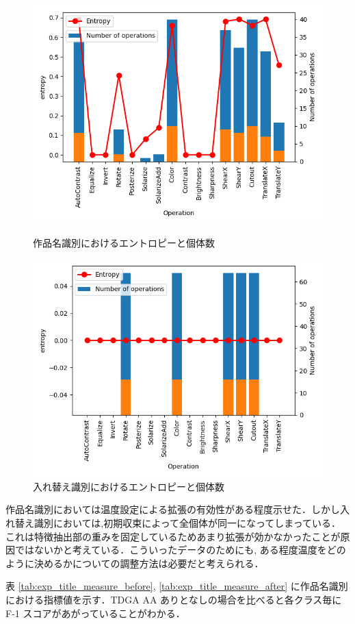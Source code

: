 \documentclass[onecolumn]{ujarticle}   %
\begin{document}
  \begin{figure}[h]
  \centering
  \includegraphics[width=0.6\columnwidth]{figure/num_transforms_comic.png}
  \caption{作品名識別におけるエントロピーと個体数}
  \label{fig:num_transforms_comic}

  \includegraphics[width=0.6\columnwidth]{figure/num_transforms_fourscene.png}
  \caption{入れ替え識別におけるエントロピーと個体数}
  \label{fig:num_transforms_fourscene}
  \end{figure}

  作品名識別においては温度設定による拡張の有効性がある程度示せた．しかし入れ替え識別においては,初期収束によって全個体が同一になってしまっている．これは特徴抽出部の重みを固定しているためあまり拡張が効かなかったことが原因ではないかと考えている．こういったデータのためにも, ある程度温度をどのように決めるかについての調整方法は必要だと考えられる．


  表 \ref{tab:exp_title_measure_before}, \ref{tab:exp_title_measure_after} に作品名識別における指標値を示す．TDGA AA ありとなしの場合を比べると各クラス毎に F-1 スコアがあがっていることがわかる．
\end{document}
